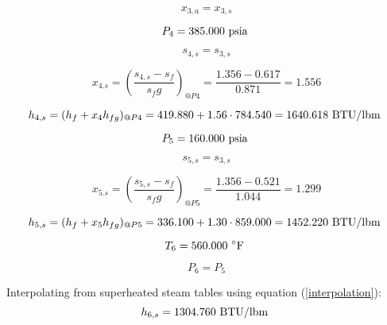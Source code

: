 \documentclass{article}
\begin{document}
\begin{equation}
x_{ 3,a} = x_{ 3,s}
\end{equation}

\begin{equation}
P_{ 4} =  385.000\textnormal{ psia                      }
\end{equation}

\begin{equation}
s_{ 4,s} = s_{ 3,s}
\end{equation}

\begin{equation}
x_{ 4.s} = (\frac{s_{ 4,s} - s_{f}}{s_fg})_{@P 4} = \frac{   1.356 -    0.617}{   0.871} =    1.556
\end{equation}

\begin{equation}
  h_{ 4,s} = (h_{f} + x_{ 4}h_{fg})_{@P 4} =  419.880 + 1.56\cdot 784.540 = 1640.618
\textnormal{ BTU/lbm                   }
\end{equation}

\begin{equation}
P_{ 5} =  160.000\textnormal{ psia                      }
\end{equation}

\begin{equation}
s_{ 5,s} = s_{ 3,s}
\end{equation}

\begin{equation}
x_{ 5.s} = (\frac{s_{ 5,s} - s_{f}}{s_fg})_{@P 5} = \frac{   1.356 -    0.521}{   1.044} =    1.299
\end{equation}

\begin{equation}
  h_{ 5,s} = (h_{f} + x_{ 5}h_{fg})_{@P 5} =  336.100 + 1.30\cdot 859.000 = 1452.220
\textnormal{ BTU/lbm                   }
\end{equation}

\begin{equation}
T_{ 6} =  560.000\textnormal{ \(^{\circ}\)F             }
\end{equation}

\begin{equation}
P_{ 6} = P_{ 5}
\end{equation}

Interpolating from superheated steam tables using equation (\ref{interpolation}):
\begin{equation}
  h_{ 6,s} = 1304.760\textnormal{ BTU/lbm                   }
\end{equation}
\end{document}
